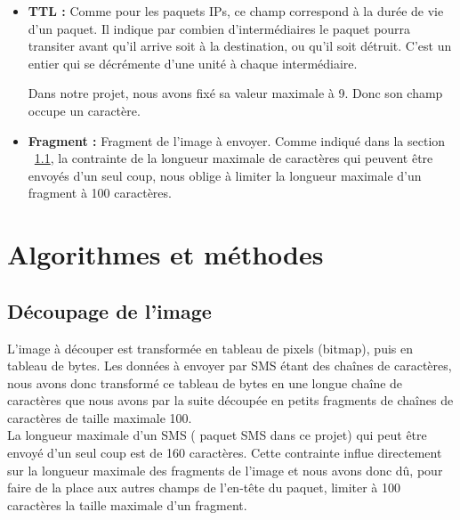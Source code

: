 \begin{itemize}
            \item \textbf{TTL :} Comme pour les paquets IPs, ce champ correspond à la durée de vie d'un paquet. Il indique par combien d'intermédiaires le paquet pourra transiter avant qu'il arrive soit à la destination, ou qu'il soit détruit. C'est un entier qui se décrémente d'une unité à chaque intermédiaire.
            
            Dans notre projet, nous avons fixé sa valeur maximale à 9. Donc son champ occupe un caractère.\\
            \item \textbf{Fragment :} Fragment de l'image à envoyer. Comme indiqué dans la section ~\ref{decoupage}, la contrainte de la longueur maximale de caractères qui peuvent être envoyés d'un seul coup, nous oblige à limiter la longueur maximale d'un fragment à 100 caractères.
        \end{itemize} 
        
        
        \section{Algorithmes et méthodes}
         \subsection{Découpage de l'image}\label{decoupage}
        L'image à découper est transformée en tableau de pixels (bitmap), puis en tableau de bytes. 
        Les données à envoyer par SMS étant des chaînes de caractères, nous avons donc transformé ce tableau de bytes en une longue chaîne de caractères que nous avons par la suite découpée en petits fragments de chaînes de caractères de taille maximale 100. \\
        La longueur maximale d'un SMS ( paquet SMS dans ce projet) qui peut être envoyé d'un seul coup est de 160 caractères. Cette contrainte influe directement sur la longueur maximale des fragments de l'image et nous avons donc dû, pour faire de la place aux autres champs  de l'en-tête du paquet, limiter à 100 caractères la taille maximale d'un fragment.
        
        
